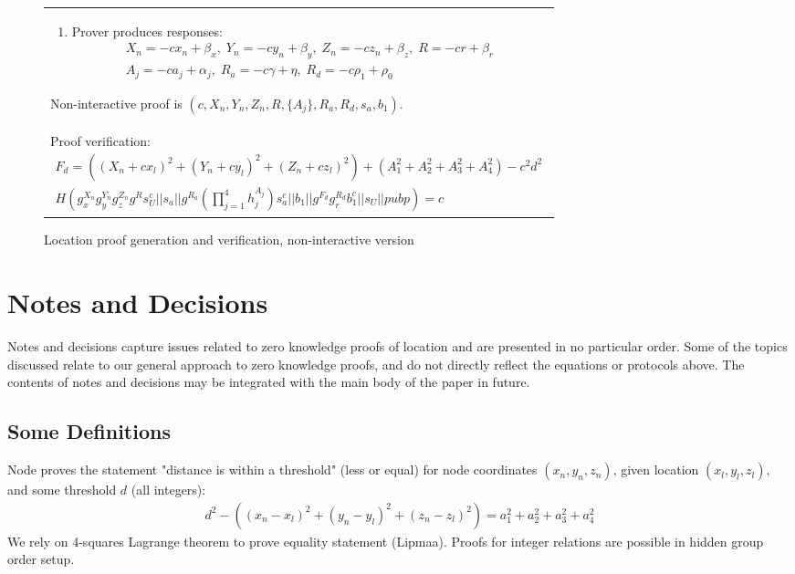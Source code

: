 \documentclass{article}
\begin{document}
\begin{figure}[!htb]
\begin{tabular}{|p{\linewidth}|}
\begin{enumerate}
\item
  Prover produces responses:
\begin{multline}
  X_n = -c x_n + \beta_x,  \;
  Y_n = -c y_n + \beta_y,  \;
  Z_n = -c z_n + \beta_z,   \;
  R = -c r + \beta_r   \\
  A_j = -c a_j + \alpha_j, \;
  R_a = -c \gamma + \eta,   \;
  R_d = -c \rho_1 + \rho_0
\end{multline}
\end{enumerate}
Non-interactive proof is
$(c, X_n, Y_n, Z_n, R, \{A_j\}, R_a, R_d, s_a, b_1)$.
\\
Proof verification:
\begin{multline}
\label{verf-chash}
  F_d = ((X_n + c x_l)^2 + (Y_n + c y_l)^2 + (Z_n + c z_l)^2) + (A_1^2 + A_2^2 + A_3^2 + A_4^2) - c^2 d^2 \\
  H(g_x^{X_n} g_y^{Y_n} g_z^{Z_n} g^{R} s_U^{c} ||
    s_a ||
    g^{R_a} (\prod_{j=1}^4 h_j^{A_j}) s_a^{c} ||
    b_1 ||
    g^{F_d} g_r^{R_d} b_1^c ||
    s_U ||
    pubp)
  = c
\end{multline}
\\
\hline
\end{tabular}
\caption{Location proof generation and verification, non-interactive version}
\label{ni_fig}
\end{figure}



\section{Notes and Decisions}

Notes and decisions capture issues related to zero knowledge proofs of location and are presented in no particular order. Some of the topics discussed relate to our general approach to zero knowledge proofs, and do not directly reflect the equations or protocols above. The contents of notes and decisions may be integrated with the main body of the paper in future. 

\subsection{Some Definitions}
\label{sect-definitions}
Node proves the statement "distance is within a threshold" (less or equal)
for node coordinates $(x_n, y_n, z_n)$,
given location $(x_l, y_l, z_l)$,
and some threshold $d$ (all integers):
\begin{gather}
\label{eq-distn}
d^2 - ((x_n - x_l)^2 + (y_n - y_l)^2 + (z_n - z_l)^2) = a_1^2 + a_2^2 + a_3^2 + a_4^2
\end{gather}
We rely on 4-squares Lagrange theorem to prove equality statement (Lipmaa).
Proofs for integer relations are possible in hidden group order setup.
\end{document}
